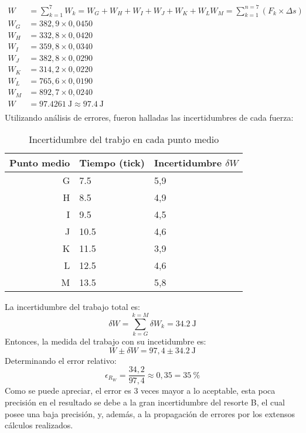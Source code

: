 \documentclass[../main.tex]{subfiles}
\begin{document}
\begin{align*}
  W &= \sum_{k = 1}^{7} W_k = W_G + W_H + W_I + W_J + W_K + W_L W_M = \sum_{k = 1}^{n = 7} (F_k \times \Delta s)\\
  W_G &= 382,9 \times 0,0450 \\
  W_H &= 332,8 \times 0,0420 \\
  W_I &= 359,8 \times 0,0340 \\
  W_J &= 382,8 \times 0,0290 \\
  W_K &= 314,2 \times 0,0220 \\
  W_L &= 765,6 \times 0,0190 \\
  W_M &= 892,7 \times 0,0240 \\
  W &= \qty{97,4261}{\joule} \approx \qty{97,4}{\joule}\\
\end{align*}
Utilizando análisis de errores, fueron halladas las incertidumbres de cada fuerza:
\begin{table}[H]
  \caption{Incertidumbre del trabjo en cada punto medio}
  \label{tab:uncer_work}
  \begin{center}
    \begin{tabular}[c]{rll}
      \toprule
      \multicolumn{1}{c}{\textbf{Punto medio}} & 
      \multicolumn{1}{c}{\textbf{Tiempo} (tick)} & 
      \multicolumn{1}{c}{\textbf{Incertidumbre} $\delta W$} \\
      \midrule
      G & \num{7,5} & 5,9 \\
      H & \num{8,5} & 4,9 \\
      I & \num{9,5} & 4,5 \\
      J & \num{10,5} & 4,6 \\
      K & \num{11,5} & 3,9 \\
      L & \num{12,5} & 4,6 \\
      M & \num{13,5} & 5,8 \\
      \bottomrule
    \end{tabular}
  \end{center}
\end{table}
La incertidumbre del trabajo total es:
\begin{equation}
  \delta W = \sum_{k = G}^{k = M} \delta W_k = \qty{34,2}{\joule}
  \label{eq:total_work_error}
\end{equation}
Entonces, la medida del trabajo con su incetidumbre es:
\begin{equation}
  W \pm \delta W = 97,4 \pm \qty{34,2}{\joule}
  \label{eq:work_final}
\end{equation}
Determinando el error relativo:
\begin{equation}
  \epsilon_R_W = \frac{34,2}{97,4} \approx 0,35 = \qty{35}{\percent}
  \label{eq:work_error_rel}
\end{equation}
Como se puede apreciar, el error es 3 veces mayor a lo aceptable, esta poca precisión en el resultado se debe a la gran incertidumbre del resorte B, el cual posee una baja precisión, y, además, a la propagación de errores por los extensos cálculos realizados.
\end{document}
